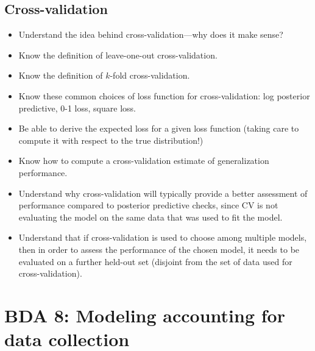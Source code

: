 \documentclass[12pt]{article}
\begin{document}
\subsection{Cross-validation}
\begin{itemize}
\item Understand the idea behind cross-validation---why does it make sense?
\item Know the definition of leave-one-out cross-validation.
\item Know the definition of $k$-fold cross-validation.
\item Know these common choices of loss function for cross-validation: log posterior predictive, 0-1 loss, square loss.
\item Be able to derive the expected loss for a given loss function (taking care to compute it with respect to the true distribution!)
\item Know how to compute a cross-validation estimate of generalization performance.
\item Understand why cross-validation will typically provide a better assessment of performance compared to posterior predictive checks, since CV is not evaluating the model on the same data that was used to fit the model.
\item Understand that if cross-validation is used to choose among multiple models, then in order to assess the performance of the chosen model, it needs to be evaluated on a further held-out set (disjoint from the set of data used for cross-validation).
\end{itemize}


\section{BDA 8: Modeling accounting for data collection}
\end{document}

